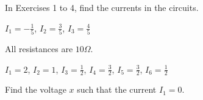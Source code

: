 In Exercises 1 to 4, find the currents in the circuits.
\begin{multicols}{2}
\begin{ex}
\begin{figure}[H]
\vspace*{-2em}
\centering

\end{figure}
\end{ex}

\begin{ex}
\begin{figure}[H]
\centering

\end{figure}
\begin{sol}
$ I_1 = -\frac{1}{5}$, $I_2 = \frac{3}{5}$, $I_3 = \frac{4}{5} $

\end{sol}
\end{ex}

\columnbreak
\begin{ex}
\begin{figure}[H]
\centering

\end{figure}
\end{ex}

\begin{ex}
All resistances are $10 \Omega$.

\begin{figure}[H]
\centering

\end{figure}
\begin{sol}
$ I_1 = 2$, $I_2 = 1$, $I_3 = \frac{1}{2}$, $I_4 = \frac{3}{2}$, $I_5 = \frac{3}{2}$, $I_6 = \frac{1}{2}$

\end{sol}
\end{ex}
\end{multicols}

\setlength{\columnsep}{-20pt}
\begin{multicols}{2}
\begin{ex}
\newline
Find the voltage $x$ such that the current $I_1 = 0$.
\columnbreak
\begin{figure}[H]
\centering

\end{figure}
\end{ex}
\end{multicols}
\setlength{\columnsep}{10pt}

